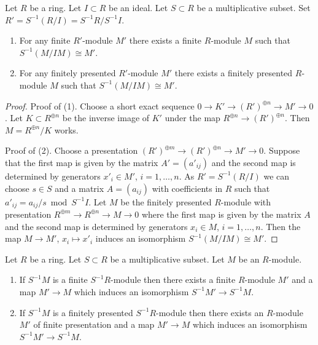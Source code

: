 \begin{lemma}
\label{lemma-construct-fp-module}
Let $R$ be a ring.
Let $I \subset R$ be an ideal.
Let $S \subset R$ be a multiplicative subset.
Set $R' = S^{-1}(R/I) = S^{-1}R/S^{-1}I$.
\begin{enumerate}
\item For any finite $R'$-module $M'$ there exists a
finite $R$-module $M$ such that $S^{-1}(M/IM) \cong M'$.
\item For any finitely presented $R'$-module $M'$ there exists a
finitely presented $R$-module $M$ such that $S^{-1}(M/IM) \cong M'$.
\end{enumerate}
\end{lemma}

\begin{proof}
Proof of (1). Choose a short exact sequence
$0 \to K' \to (R')^{\oplus n} \to M' \to 0$.
Let $K \subset R^{\oplus n}$ be the inverse image of
$K'$ under the map $R^{\oplus n} \to (R')^{\oplus n}$.
Then $M = R^{\oplus n}/K$ works.

\medskip\noindent
Proof of (2).
Choose a presentation $(R')^{\oplus m} \to (R')^{\oplus n} \to M' \to 0$.
Suppose that the first map is given by the matrix
$A' = (a'_{ij})$ and the second map is determined by generators
$x'_i \in M'$, $i = 1, \ldots, n$. As $R' = S^{-1}(R/I)$ we can choose
$s \in S$ and a matrix $A = (a_{ij})$ with coefficients in $R$
such that $a'_{ij} = a_{ij} / s \bmod S^{-1}I$. Let $M$ be the
finitely presented $R$-module with presentation
$R^{\oplus m} \to R^{\oplus n} \to M \to 0$
where the first map is given by the matrix $A$ and the second map is
determined by generators $x_i \in M$, $i = 1, \ldots, n$.
Then the map $M \to M'$, $x_i \mapsto x'_i$ induces an isomorphism
$S^{-1}(M/IM) \cong M'$.
\end{proof}

\begin{lemma}
\label{lemma-construct-fp-module-from-localization}
Let $R$ be a ring.
Let $S \subset R$ be a multiplicative subset.
Let $M$ be an $R$-module.
\begin{enumerate}
\item If $S^{-1}M$ is a finite $S^{-1}R$-module then there
exists a finite $R$-module $M'$ and a map $M' \to M$ which induces an
isomorphism $S^{-1}M' \to S^{-1}M$.
\item If $S^{-1}M$ is a finitely presented $S^{-1}R$-module
then there exists an $R$-module $M'$ of finite presentation
and a map $M' \to M$ which induces an isomorphism
$S^{-1}M' \to S^{-1}M$.
\end{enumerate}
\end{lemma}

